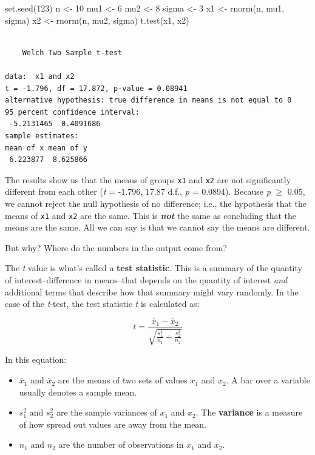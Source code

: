 \documentclass[
  13,
  letterpaper,
]{report}
\newenvironment{Shaded}{\begin{snugshade}}{\end{snugshade}}
\newcommand{\DecValTok}[1]{\textcolor[rgb]{0.68,0.00,0.00}{#1}}
\newcommand{\FunctionTok}[1]{\textcolor[rgb]{0.28,0.35,0.67}{#1}}
\newcommand{\NormalTok}[1]{\textcolor[rgb]{0.00,0.23,0.31}{#1}}
\newcommand{\OtherTok}[1]{\textcolor[rgb]{0.00,0.23,0.31}{#1}}
\providecommand{\tightlist}{%
  \setlength{\itemsep}{0pt}\setlength{\parskip}{0pt}}
\begin{document}
\begin{Shaded}
\begin{Highlighting}[]
\FunctionTok{set.seed}\NormalTok{(}\DecValTok{123}\NormalTok{)}
\NormalTok{n }\OtherTok{\textless{}{-}} \DecValTok{10}
\NormalTok{mu1 }\OtherTok{\textless{}{-}} \DecValTok{6}
\NormalTok{mu2 }\OtherTok{\textless{}{-}} \DecValTok{8}
\NormalTok{sigma }\OtherTok{\textless{}{-}} \DecValTok{3}
\NormalTok{x1 }\OtherTok{\textless{}{-}} \FunctionTok{rnorm}\NormalTok{(n, mu1, sigma)}
\NormalTok{x2 }\OtherTok{\textless{}{-}} \FunctionTok{rnorm}\NormalTok{(n, mu2, sigma)}
\FunctionTok{t.test}\NormalTok{(x1, x2)}
\end{Highlighting}
\end{Shaded}

\begin{verbatim}

    Welch Two Sample t-test

data:  x1 and x2
t = -1.796, df = 17.872, p-value = 0.08941
alternative hypothesis: true difference in means is not equal to 0
95 percent confidence interval:
 -5.2131465  0.4091686
sample estimates:
mean of x mean of y 
 6.223877  8.625866 
\end{verbatim}

The results show us that the means of groups \texttt{x1} and \texttt{x2}
are not significantly different from each other (\emph{t} = -1.796,
17.87 d.f., \emph{p} = 0.0894). Because \emph{p} \(\ge\) 0.05, we cannot
reject the null hypothesis of no difference; i.e., the hypothesis that
the means of \texttt{x1} and \texttt{x2} are the same. This is
\textbf{\emph{not}} the same as concluding that the means are the same.
All we can say is that we cannot say the means are different.

But why? Where do the numbers in the output come from?

The \emph{t} value is what's called a \textbf{test statistic}. This is a
summary of the quantity of interest--difference in means--that depends
on the quantity of interest \emph{and} additional terms that describe
how that summary might vary randomly. In the case of the \emph{t}-test,
the test statistic \emph{t} is calculated as:

\[t=\frac{{\bar{x}}_1-{\bar{x}}_2}{\sqrt{\frac{s_1^2}{n_1}+\frac{s_2^2}{n_2}}}\]

In this equation:

\begin{itemize}
\tightlist
\item
  \({\bar{x}}_1\) and \({\bar{x}}_2\) are the means of two sets of
  values \(x_1\) and \(x_2\). A bar over a variable usually denotes a
  sample mean.
\item
  \(s_1^2\) and \(s_2^2\) are the sample variances of \(x_1\) and
  \(x_2\). The \textbf{variance} is a measure of how spread out values
  are away from the mean.
\item
  \(n_1\) and \(n_2\) are the number of observations in \(x_1\) and
  \(x_2\).
\end{itemize}
\end{document}
